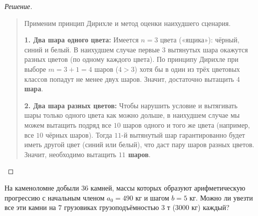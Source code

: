 \begin{proof}[Решение]~\\
    \begin{quote}
        Применим принцип Дирихле и метод оценки наихудшего сценария.

        \textbf{1. Два шара одного цвета:} 
        Имеется $n = 3$ цвета («ящика»): чёрный, синий и белый. В 
        наихудшем случае первые $3$ вытянутых шара окажутся разных цветов 
        (по одному каждого цвета). По принципу Дирихле при выборе 
        $m = 3 + 1 = 4$ шаров ($4 > 3$) хотя бы в один из трёх цветовых 
        классов попадут не менее двух шаров. Значит, достаточно вытащить 
        \textbf{$4$ шара}.

        \textbf{2. Два шара разных цветов:} 
        Чтобы нарушить условие и вытягивать шары только одного цвета как 
        можно дольше, в наихудшем случае мы можем вытащить подряд все $10$ 
        шаров одного и того же цвета (например, все $10$ чёрных шаров). 
        Тогда $11$-й вытянутый шар гарантированно будет иметь другой цвет 
        (синий или белый), что даст пару шаров разных цветов. Значит, 
        необходимо вытащить \textbf{$11$ шаров}.
    \end{quote}
\end{proof}

\begin{problem}
    На каменоломне добыли $36$ камней, массы которых образуют 
    арифметическую прогрессию с начальным членом $a_0 = 490\text{ кг}$ и 
    шагом $b = 5\text{ кг}$. Можно ли увезти все эти камни на $7$ 
    грузовиках грузоподъёмностью $3\text{ т}$ ($3000\text{ кг}$) каждый?
\end{problem}

